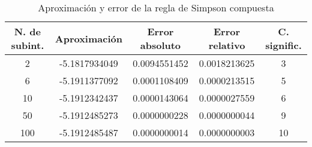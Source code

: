 \begin{table}[H]
  \begin{center}
    \begin{tabular}{|c|c|c|c|c|} \hline 
      \textbf{N. de subint.} & \textbf{Aproximaci\'on} & \textbf{Error absoluto} & \textbf{Error relativo}& \textbf{C. signific.}\\ 
      \hline
      2 & -5.1817934049 & 0.0094551452 & 0.0018213625 & 3
      \\
      \hline
      6 & -5.1911377092 & 0.0001108409 & 0.0000213515 & 5
      \\
      \hline
      10 & -5.1912342437 & 0.0000143064 & 0.0000027559 & 6
      \\
      \hline
      50 & -5.1912485273 & 0.0000000228 & 0.0000000044 & 9
      \\
      \hline
      100 & -5.1912485487 & 0.0000000014 & 0.0000000003 & 10
      \\
      \hline
    \end{tabular}
  \end{center}
  \caption{Aproximaci\'on y error de la regla de Simpson compuesta}
  \label{tab:4}
\end{table}

